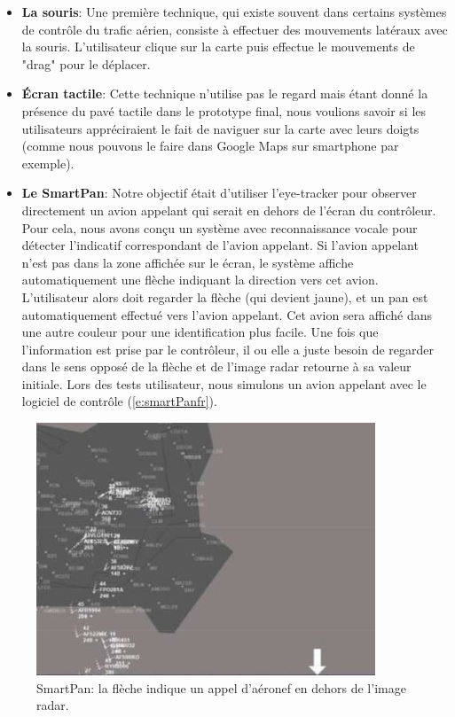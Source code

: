 \begin{itemize}

\item \textbf{ La souris}: Une première technique, qui existe souvent dans certains systèmes de contrôle du trafic aérien, consiste à effectuer des mouvements latéraux avec la souris. L'utilisateur clique sur la carte puis effectue le mouvements de "drag" pour le déplacer.

\item \textbf{Écran tactile}: Cette technique n’utilise pas le regard mais étant donné la présence du pavé tactile dans le prototype final, nous voulions savoir si les utilisateurs appréciraient le fait de naviguer sur la carte avec leurs doigts (comme nous pouvons le faire dans Google Maps sur smartphone par exemple).

\item \textbf{Le SmartPan}: Notre objectif était d'utiliser l'eye-tracker pour observer directement un avion appelant qui serait en dehors de l'écran du contrôleur.
Pour cela, nous avons conçu un système avec reconnaissance vocale
pour détecter l'indicatif correspondant de l'avion appelant. Si l'avion appelant n'est pas dans la zone affichée sur le
écran, le système affiche automatiquement une flèche indiquant la direction vers cet avion. L'utilisateur alors doit regarder la flèche (qui devient jaune), et un pan est automatiquement effectué vers l'avion appelant. Cet avion sera affiché dans une autre couleur pour une identification plus facile. Une fois que l'information est prise par le contrôleur, il ou elle a juste besoin de regarder dans le sens opposé de la flèche et de l'image radar retourne à sa valeur initiale. Lors des tests utilisateur, nous simulons un avion appelant avec le logiciel de contrôle (\autoref{e:smartPanfr}).

\end{itemize}
\begin{figure}
 \centering
	\includegraphics{Figures/smartPan.png}
	\caption{SmartPan: la flèche indique un appel d'aéronef en dehors de l'image radar.}
	\label{e:smartPanfr}
\end{figure}




